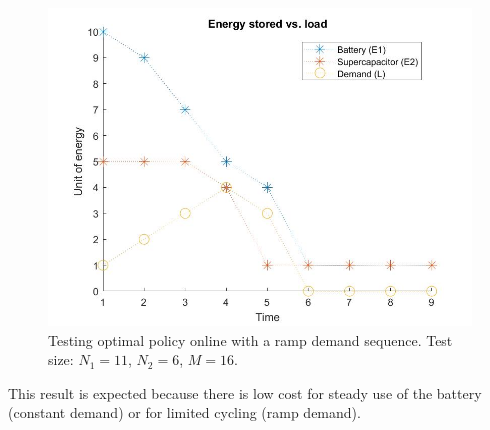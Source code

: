 \documentclass[conference]{IEEEtran}
\begin{document}
\begin{figure}[htbp]
\centerline{\includegraphics[scale=0.25]{EnergyStoredvsload_RampLoad(E1_max=10,E2_max=5).jpg}}
\caption{Testing optimal policy online with a ramp demand sequence. Test size: $N_{1}=11$, $N_{2}=6$, $M=16$.}
\label{fig:RampDemand}
\end{figure} This result is expected because there is low cost for steady use of the battery (constant demand) or for limited cycling (ramp demand).
\end{document}
